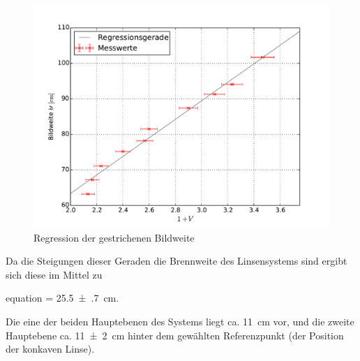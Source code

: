 	\begin{figure}[!h]
		\centering
		\includegraphics[scale=.7]{Grafiken/Messwerte_Abbe1.pdf}
		\caption{Regression der gestrichenen Bildweite\label{fig:Auswertung_AbbeB}}
	\end{figure}
	
	
	
	
	Da die Steigungen dieser Geraden die Brennweite des Linsensystems sind ergibt sich
	diese im Mittel zu
 	\begin{empheq}{equation}
 		 = \SI{25.5(7)}{\centi\meter}.
 	\end{empheq}
 	
 	Die eine der beiden Hauptebenen des Systems liegt ca. \SI{11}{\centi\meter} vor,
 	und die zweite Hauptebene ca. \SI{11(2)}{\centi\meter} hinter dem gewählten 
 	Referenzpunkt (der Position der konkaven Linse).  
 	